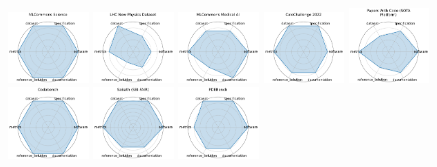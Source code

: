 \begin{figure}[ht!]
\\[1ex]
\includegraphics[width=0.1900\textwidth]{images/mlcommons_science_radar.pdf}
\includegraphics[width=0.1900\textwidth]{images/lhc_new_physics_dataset_radar.pdf}
\includegraphics[width=0.1900\textwidth]{images/mlcommons_medical_ai_radar.pdf}
\includegraphics[width=0.1900\textwidth]{images/calochallenge__radar.pdf}
\includegraphics[width=0.1900\textwidth]{images/papers_with_code_sota_platform_radar.pdf}
\\[1ex]
\includegraphics[width=0.1900\textwidth]{images/codabench_radar.pdf}
\includegraphics[width=0.1900\textwidth]{images/sabath_sbi-fair_radar.pdf}
\includegraphics[width=0.1900\textwidth]{images/pdebench_radar.pdf}

\end{figure}
